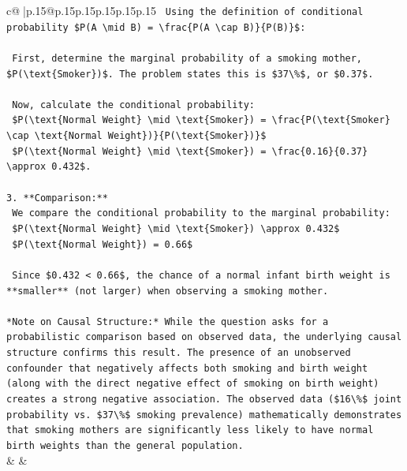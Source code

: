 \documentclass{article}
\begin{document}
{\begin{supertabular}{c@{$\;$}|p{.15\linewidth}@{}p{.15\linewidth}p{.15\linewidth}p{.15\linewidth}p{.15\linewidth}p{.15\linewidth}}
{{{\texttt{    Using the definition of conditional probability \$P(A \textbackslash{}mid B) = \textbackslash{}frac\{P(A \textbackslash{}cap B)\}\{P(B)\}\$:} \\
\\ 
\texttt{    First, determine the marginal probability of a smoking mother, \$P(\textbackslash{}text\{Smoker\})\$. The problem states this is \$37\textbackslash{}\%\$, or \$0.37\$.} \\
\\ 
\texttt{    Now, calculate the conditional probability:} \\
\texttt{    \$P(\textbackslash{}text\{Normal Weight\} \textbackslash{}mid \textbackslash{}text\{Smoker\}) = \textbackslash{}frac\{P(\textbackslash{}text\{Smoker\} \textbackslash{}cap \textbackslash{}text\{Normal Weight\})\}\{P(\textbackslash{}text\{Smoker\})\}\$} \\
\texttt{    \$P(\textbackslash{}text\{Normal Weight\} \textbackslash{}mid \textbackslash{}text\{Smoker\}) = \textbackslash{}frac\{0.16\}\{0.37\} \textbackslash{}approx 0.432\$.} \\
\\ 
\texttt{3.  **Comparison:**} \\
\texttt{    We compare the conditional probability to the marginal probability:} \\
\texttt{    \$P(\textbackslash{}text\{Normal Weight\} \textbackslash{}mid \textbackslash{}text\{Smoker\}) \textbackslash{}approx 0.432\$} \\
\texttt{    \$P(\textbackslash{}text\{Normal Weight\}) = 0.66\$} \\
\\ 
\texttt{    Since \$0.432 < 0.66\$, the chance of a normal infant birth weight is **smaller** (not larger) when observing a smoking mother.} \\
\\ 
\texttt{*Note on Causal Structure:* While the question asks for a probabilistic comparison based on observed data, the underlying causal structure confirms this result. The presence of an unobserved confounder that negatively affects both smoking and birth weight (along with the direct negative effect of smoking on birth weight) creates a strong negative association. The observed data (\$16\textbackslash{}\%\$ joint probability vs. \$37\textbackslash{}\%\$ smoking prevalence) mathematically demonstrates that smoking mothers are significantly less likely to have normal birth weights than the general population.} \\
            }
        }
    }
    & & \\ \\


\end{supertabular}}
\end{document}

